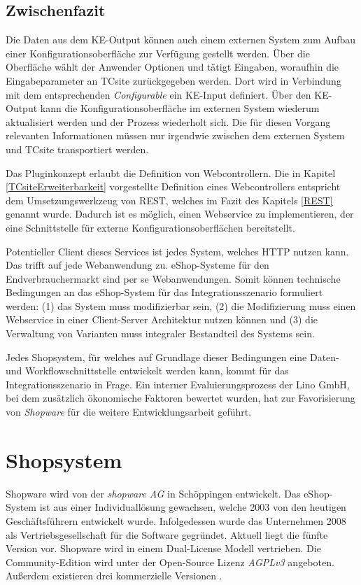 \documentclass[11pt, a4paper, titlepage, listof=totoc, bibliography=totoc, index=totoc, twoside, openright, headings=normal, draft]{scrreprt}
\begin{document}
\subsection{Zwischenfazit}
\label{TCsiteFazit}

Die Daten aus dem KE-Output können auch einem externen System zum Aufbau einer Konfigurationsoberfläche zur Verfügung gestellt werden. Über die Oberfläche wählt der Anwender Optionen und tätigt Eingaben, woraufhin die Eingabeparameter an TCsite zurückgegeben werden. Dort wird in Verbindung mit dem entsprechenden \emph{Configurable} ein KE-Input definiert. Über den KE-Output kann die Konfigurationsoberfläche im externen System wiederum aktualisiert werden und der Prozess wiederholt sich. Die für diesen Vorgang relevanten Informationen müssen nur irgendwie zwischen dem externen System und TCsite transportiert werden.

Das Pluginkonzept erlaubt die Definition von Webcontrollern. Die in Kapitel \ref{TCsiteErweiterbarkeit} vorgestellte Definition eines Webcontrollers entspricht dem  Umsetzungswerkzeug von REST, welches im Fazit des Kapitels \ref{REST} genannt wurde. Dadurch ist es möglich, einen Webservice zu implementieren, der eine Schnittstelle für externe Konfigurationsoberflächen bereitstellt.

Potentieller Client dieses Services ist jedes System, welches HTTP nutzen kann. Das trifft auf jede Webanwendung zu. eShop-Systeme für den Endverbrauchermarkt sind per se Webanwendungen. Somit können technische Bedingungen an das eShop-System für das Integrationsszenario formuliert werden: (1) das System muss modifizierbar sein, (2) die Modifizierung muss einen Webservice in einer Client-Server Architektur nutzen können und (3) die Verwaltung von Varianten muss integraler Bestandteil des Systems sein.

Jedes Shopsystem, für welches auf Grundlage dieser Bedingungen eine Daten- und Workflowschnittstelle entwickelt werden kann, kommt für das Integrationsszenario in Frage. Ein interner Evaluierungsprozess der Lino GmbH, bei dem zusätzlich ökonomische Faktoren bewertet wurden, hat zur Favorisierung von \emph{Shopware} für die weitere Entwicklungsarbeit geführt.

\section{Shopsystem}
\label{subsection:Shopsystem}

Shopware wird von der \emph{shopware AG} in Schöppingen entwickelt. Das eShop-System ist aus einer Individuallösung gewachsen, welche 2003 von den heutigen Geschäftsführern entwickelt wurde. Infolgedessen wurde das Unternehmen 2008 als Vertriebsgesellschaft für die Software gegründet. Aktuell liegt die fünfte Version vor. Shopware wird in einem Dual-License Modell vertrieben. Die Community-Edition wird unter der \citeauthor{gnuAGPLv3} Open-Source Lizenz \emph{AGPLv3} angeboten. Außerdem existieren drei kommerzielle Versionen \citep{shopwareUnternehmen}.
\end{document}
